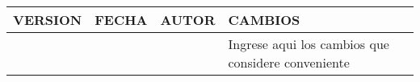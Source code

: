 \begin{table}[H]
\begin{tabular}{|m{1.3cm}|m{1.5cm}|m{2cm}|m{6cm}|} \hline
\cellcolor{colorTerciario}VERSION & \cellcolor{colorTerciario}FECHA & \cellcolor{colorTerciario}AUTOR & \cellcolor{colorTerciario}CAMBIOS \\ \hline
 &  &   &  Ingrese aqui los cambios que considere conveniente \\ \hline
\end{tabular}
\end{table}